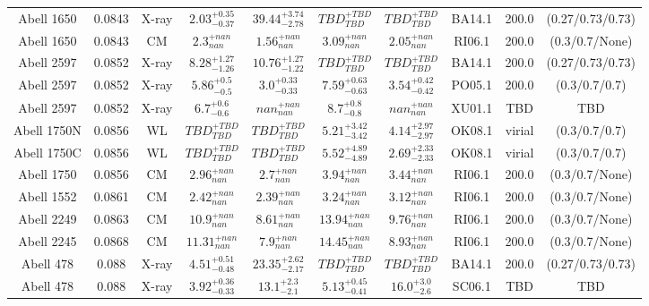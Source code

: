 \begin{table}
\begin{tabular}{cccccccccc}
Abell 1650 & 0.0843 & X-ray & ${2.03}^{+0.35}_{-0.37}$ & ${39.44}^{+3.74}_{-2.78}$ & ${TBD}^{+TBD}_{TBD}$ & ${TBD}^{+TBD}_{TBD}$ & BA14.1 & 200.0 & (0.27/0.73/0.73) \\
Abell 1650 & 0.0843 & CM & ${2.3}^{+nan}_{nan}$ & ${1.56}^{+nan}_{nan}$ & ${3.09}^{+nan}_{nan}$ & ${2.05}^{+nan}_{nan}$ & RI06.1 & 200.0 & (0.3/0.7/None) \\
Abell 2597 & 0.0852 & X-ray & ${8.28}^{+1.27}_{-1.26}$ & ${10.76}^{+1.27}_{-1.22}$ & ${TBD}^{+TBD}_{TBD}$ & ${TBD}^{+TBD}_{TBD}$ & BA14.1 & 200.0 & (0.27/0.73/0.73) \\
Abell 2597 & 0.0852 & X-ray & ${5.86}^{+0.5}_{-0.5}$ & ${3.0}^{+0.33}_{-0.33}$ & ${7.59}^{+0.63}_{-0.63}$ & ${3.54}^{+0.42}_{-0.42}$ & PO05.1 & 200.0 & (0.3/0.7/0.7) \\
Abell 2597 & 0.0852 & X-ray & ${6.7}^{+0.6}_{-0.6}$ & ${nan}^{+nan}_{nan}$ & ${8.7}^{+0.8}_{-0.8}$ & ${nan}^{+nan}_{nan}$ & XU01.1 & TBD & TBD \\
Abell 1750N & 0.0856 & WL & ${TBD}^{+TBD}_{TBD}$ & ${TBD}^{+TBD}_{TBD}$ & ${5.21}^{+3.42}_{-3.42}$ & ${4.14}^{+2.97}_{-2.97}$ & OK08.1 & virial & (0.3/0.7/0.7) \\
Abell 1750C & 0.0856 & WL & ${TBD}^{+TBD}_{TBD}$ & ${TBD}^{+TBD}_{TBD}$ & ${5.52}^{+4.89}_{-4.89}$ & ${2.69}^{+2.33}_{-2.33}$ & OK08.1 & virial & (0.3/0.7/0.7) \\
Abell 1750 & 0.0856 & CM & ${2.96}^{+nan}_{nan}$ & ${2.7}^{+nan}_{nan}$ & ${3.94}^{+nan}_{nan}$ & ${3.44}^{+nan}_{nan}$ & RI06.1 & 200.0 & (0.3/0.7/None) \\
Abell 1552 & 0.0861 & CM & ${2.42}^{+nan}_{nan}$ & ${2.39}^{+nan}_{nan}$ & ${3.24}^{+nan}_{nan}$ & ${3.12}^{+nan}_{nan}$ & RI06.1 & 200.0 & (0.3/0.7/None) \\
Abell 2249 & 0.0863 & CM & ${10.9}^{+nan}_{nan}$ & ${8.61}^{+nan}_{nan}$ & ${13.94}^{+nan}_{nan}$ & ${9.76}^{+nan}_{nan}$ & RI06.1 & 200.0 & (0.3/0.7/None) \\
Abell 2245 & 0.0868 & CM & ${11.31}^{+nan}_{nan}$ & ${7.9}^{+nan}_{nan}$ & ${14.45}^{+nan}_{nan}$ & ${8.93}^{+nan}_{nan}$ & RI06.1 & 200.0 & (0.3/0.7/None) \\
Abell 478 & 0.088 & X-ray & ${4.51}^{+0.51}_{-0.48}$ & ${23.35}^{+2.62}_{-2.17}$ & ${TBD}^{+TBD}_{TBD}$ & ${TBD}^{+TBD}_{TBD}$ & BA14.1 & 200.0 & (0.27/0.73/0.73) \\
Abell 478 & 0.088 & X-ray & ${3.92}^{+0.36}_{-0.33}$ & ${13.1}^{+2.3}_{-2.1}$ & ${5.13}^{+0.45}_{-0.41}$ & ${16.0}^{+3.0}_{-2.6}$ & SC06.1 & TBD & TBD \\

\end{tabular}
\end{table}
